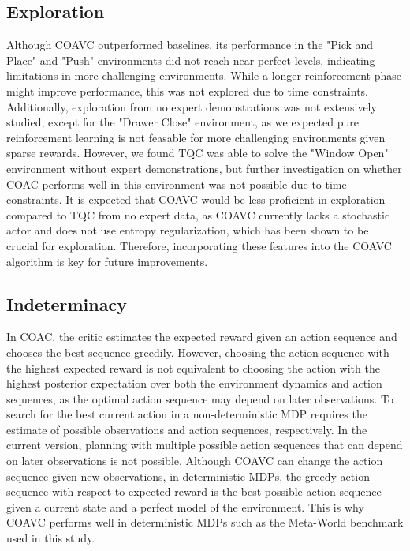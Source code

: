 \subsection{Exploration}
Although COAVC outperformed baselines, its performance in the "Pick and Place" and "Push" environments did not reach near-perfect levels, 
indicating limitations in more challenging environments. While a longer reinforcement phase might improve performance, this was not explored 
due to time constraints. Additionally, exploration from no expert demonstrations was not extensively studied, except for the "Drawer Close" 
environment, as we expected pure reinforcement learning is not feasable for more challenging environments given sparse rewards. 
However, we found TQC was able to solve the "Window Open" environment without expert demonstrations, but further investigation on whether 
COAC performs well in this environment was not possible due to time constraints. It is expected that COAVC would be less proficient in exploration 
compared to TQC from no expert data, as COAVC currently lacks a stochastic actor and does not use entropy regularization, which has been shown to 
be crucial for exploration. Therefore, incorporating these features into the COAVC algorithm is key for future improvements.

\subsection{Indeterminacy}
In COAC, the critic estimates the expected reward given an action sequence and chooses the best sequence greedily. 
However, choosing the action sequence with the highest expected reward is not equivalent to choosing the action with the highest posterior 
expectation over both the environment dynamics and action sequences, as the optimal action sequence may depend on later observations. To 
search for the best current action in a non-deterministic MDP requires the estimate of possible observations and action sequences, respectively. 
In the current version, planning with multiple possible action sequences that can depend on later observations is not possible. 
Although COAVC can change the action sequence given new observations, in deterministic MDPs, the greedy action sequence with respect to expected 
reward is the best possible action sequence given a current state and a perfect model of the environment. This is why COAVC performs well in 
deterministic MDPs such as the Meta-World benchmark used in this study.